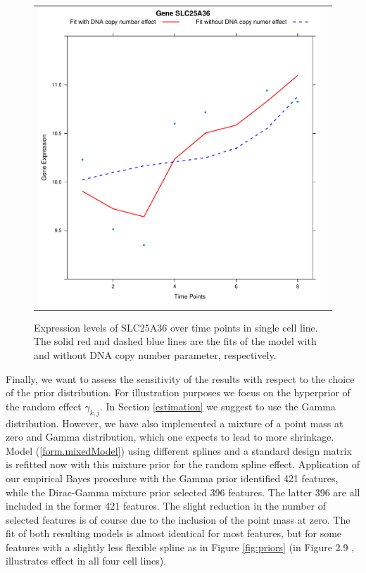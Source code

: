 \begin{figure}[h!]
\centering
\begin{tabular}{c}
\includegraphics[scale=0.55]{Figure6.pdf}
\end{tabular}
\caption{Expression levels of SLC25A36 over time points in single cell line. The
 solid red and dashed blue lines are the fits of the model with and without DNA
copy number parameter, respectively.}
\label{fig:SLC25A36}
\end{figure}

Finally, we want to assess the sensitivity of the results with respect to the choice of the prior distribution. For illustration purposes we focus on the hyperprior of the random effect $\gamma_{k,j}$. In Section \ref{estimation} we suggest to use the Gamma distribution. However, we have also implemented a mixture of a point mass at zero and Gamma distribution, which one expects to lead to more shrinkage. Model (\ref{form.mixedModel}) using different splines and a standard design matrix is refitted now with this mixture prior for the random spline effect. Application of our empirical Bayes procedure with the Gamma prior identified 421 features, while the Dirac-Gamma mixture prior selected 396 features. The latter 396 are all included in the former 421 features. The slight reduction in the number of selected features is of course due to the inclusion of the point mass at zero. The fit of both resulting models is almost identical for most features, but for some features with a slightly less flexible spline as in Figure \ref{fig:priors} (in Figure 2.9 \cite{Supp2018}, illustrates effect in all four cell lines).

